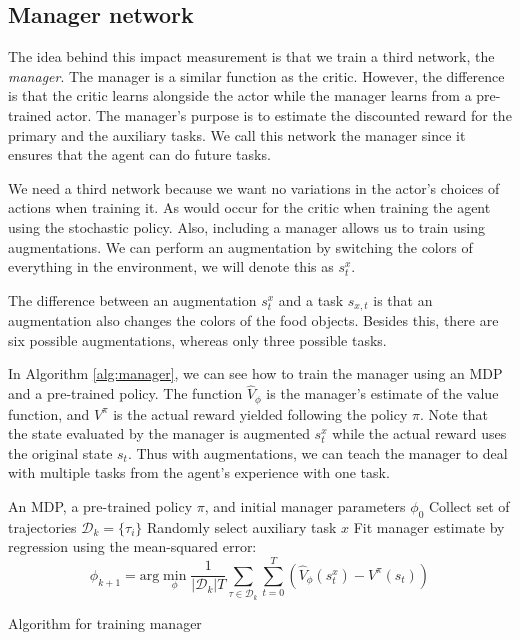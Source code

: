 \documentclass[12pt,A4]{report}
\theoremstyle{definition}
\begin{document}
\subsection{Manager network}

The idea behind this impact measurement is that we train a third network, the \textit{manager}. The manager is a similar function as the critic. However, the difference is that the critic learns alongside the actor while the manager learns from a pre-trained actor. The manager's purpose is to estimate the discounted reward for the primary and the auxiliary tasks. We call this network the manager since it ensures that the agent can do future tasks.

We need a third network because we want no variations in the actor's choices of actions when training it. As would occur for the critic when training the agent using the stochastic policy. Also, including a manager allows us to train using augmentations. We can perform an augmentation by switching the colors of everything in the environment, we will denote this as $s^x_t$. 

The difference between an augmentation $s^x_t$ and a task $s_{x,t}$ is that an augmentation also changes the colors of the food objects. Besides this, there are six possible augmentations, whereas only three possible tasks. 

In Algorithm \ref{alg:manager}, we can see how to train the manager using an MDP and a pre-trained policy. The function $\hat{V}_\phi$ is the manager's estimate of the value function, and $V^\pi$ is the actual reward yielded following the policy $\pi$. Note that the state evaluated by the manager is augmented $s^x_t$ while the actual reward uses the original state $s_t$. Thus with augmentations, we can teach the manager to deal with multiple tasks from the agent's experience with one task.

\begin{algorithm}
\begin{algorithmic}[1]
\Require An MDP, a pre-trained policy $\pi$, and initial manager parameters $\phi_0$
  \State Collect set of trajectories $\mathcal{D}_k = \{\tau_i\}$
  \State Randomly select auxiliary task $x$
  \State Fit manager estimate by regression using the mean-squared error:
  \[ \phi_{k+1} = \text{arg} \min_\phi \frac{1}{|\mathcal{D}_k|T} \sum_{\tau \in \mathcal{D}_k} \sum_{t=0}^T \left( \hat{V}_\phi(s^x_t) - V^\pi (s_t) \right)\]
\EndFor
\end{algorithmic}
\caption{Algorithm for training manager}
  \label{alg:manager}
\end{algorithm}
\end{document}
